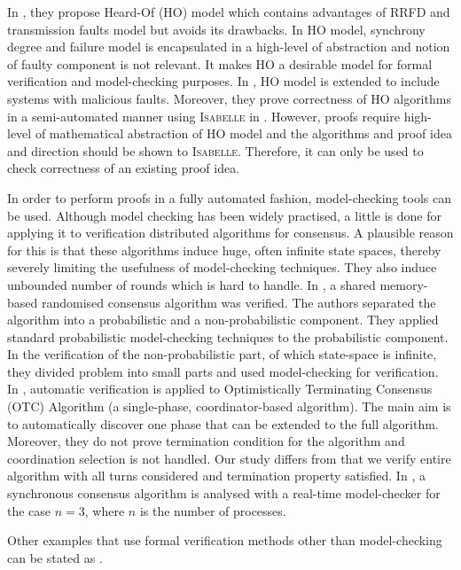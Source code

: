 \documentclass{llncs}
\begin{document}
In \cite{charron09}, they propose Heard-Of (HO) model which contains advantages of RRFD and transmission faults model but avoids its drawbacks. In HO model, synchrony degree and failure model is encapsulated in a high-level of abstraction and notion of faulty component is not relevant. It makes HO a desirable model for formal verification and model-checking purposes. In \cite{charron11}, HO model is extended to include systems with malicious faults. Moreover, they prove correctness of HO algorithms in a semi-automated manner using \textsc{Isabelle} in \cite{debrat12}. However, proofs require high-level of mathematical abstraction of HO model and the algorithms and proof idea and direction should be shown to \textsc{Isabelle}. Therefore, it can only be used to check correctness of an existing proof idea.

In order to perform proofs in a fully automated fashion, model-checking tools can be used. Although model checking has been widely practised, a little is done for applying it to verification distributed algorithms for consensus. A plausible reason for this is that these algorithms induce huge, often infinite state spaces, thereby severely limiting the usefulness of model-checking techniques. They also induce unbounded number of rounds which is hard to handle. In \cite{kwiatkowska01}, a shared memory-based randomised consensus algorithm was verified. The authors separated the algorithm into a probabilistic and a non-probabilistic component. They applied standard probabilistic model-checking techniques to the probabilistic component. In the verification of the non-probabilistic part, of which state-space is infinite, they divided problem into small parts and used model-checking for verification. In \cite{zielinski07}, automatic verification is applied to Optimistically Terminating Consensus (OTC) Algorithm (a single-phase, coordinator-based algorithm). The main aim is to automatically discover one phase that can be extended to the full algorithm. Moreover, they do not prove termination condition for the algorithm and coordination selection is not handled. Our study differs from \cite{zielinski07} that we verify entire algorithm with all turns considered and termination property satisfied. In \cite{hendriks05}, a synchronous consensus algorithm is analysed with a real-time model-checker for the case $n=3$, where $n$ is the number of processes. 

Other examples that use formal verification methods other than model-checking can be stated as \cite{win04,nestmann03,pogosyants00}.
\end{document}
